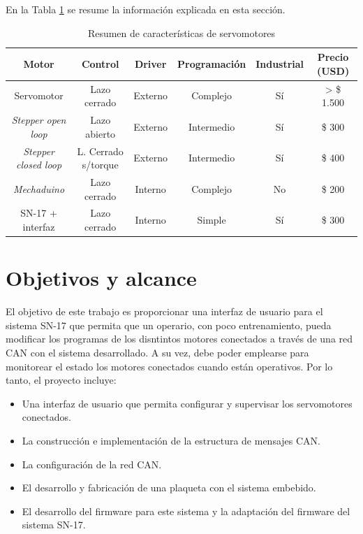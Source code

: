 
En la Tabla \ref{tab:servos} se resume la información explicada en esta sección.


\begin{table}[h]
	\centering
	\caption[Estado del arte]{Resumen de características de servomotores}
	\begin{tabular}{c c c c c c}    
		\toprule
		\textbf{Motor} 	 & \textbf{Control}  & \textbf{Driver} & \textbf{Programación} & \textbf{Industrial} & \textbf{Precio (USD)} \\
		\midrule
		Servomotor & Lazo cerrado & Externo & Complejo & Sí	& > \$ 1.500 \\		
		\textit{Stepper open loop} & Lazo abierto & Externo & Intermedio & Sí	& \$ 300\\
		\textit{Stepper closed loop} & L. Cerrado s/torque	& Externo & Intermedio & Sí	& \$ 400\\
		\textit{Mechaduino} & Lazo cerrado	& Interno & Complejo & No	& \$ 200 \\
		SN-17 + interfaz	& Lazo cerrado	& Interno & Simple & Sí		& \$ 300 \\
		\bottomrule
		\hline
	\end{tabular}
	\label{tab:servos}
\end{table}

\section{Objetivos y alcance}

El objetivo de este trabajo es proporcionar una interfaz de usuario para el sistema SN-17 que permita que un operario, con poco entrenamiento, pueda modificar los programas de los disntintos motores conectados a través de una red CAN con el sistema desarrollado. A su vez, debe poder emplearse para monitorear el estado los motores conectados cuando están operativos. Por lo tanto, el proyecto incluye:

\begin{itemize}
	\item Una interfaz de usuario que permita configurar y supervisar los servomotores conectados.
	\item La construcción e implementación de la estructura de mensajes CAN.
	\item La configuración de la red CAN.
	\item El desarrollo y fabricación de una plaqueta con el sistema embebido.
	\item El desarrollo del firmware para este sistema y la adaptación del firmware del sistema SN-17.
\end{itemize}


